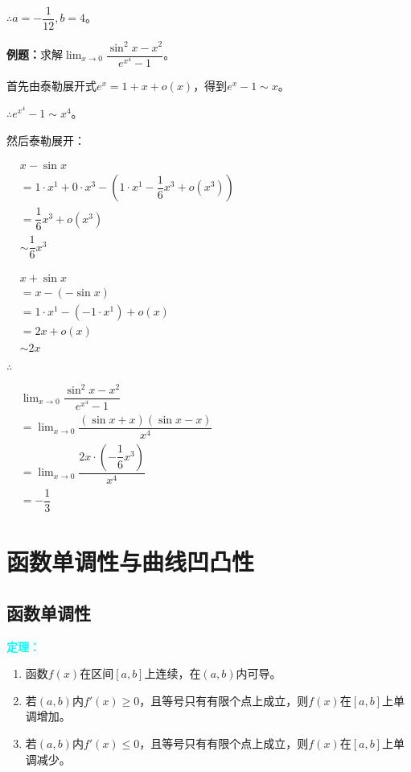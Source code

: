 \documentclass[UTF8, 12pt]{ctexart}
\begin{document}
$\therefore a=-\dfrac{1}{12},b=4$。

\textbf{例题：}求解$\lim_{x\to 0}\dfrac{\sin^2x-x^2}{e^{x^4}-1}$。

首先由泰勒展开式$e^x=1+x+o(x)$，得到$e^x-1\sim x$。

$\therefore e^{x^4}-1\sim x^4$。

然后泰勒展开：

$
\begin{aligned}
    & x-\sin x \\
    & = 1\cdot x^1+0\cdot x^3 - (1\cdot x^1-\dfrac{1}{6}x^3+o(x^3)) \\
    & = \dfrac{1}{6}x^3+o(x^3) \\
    & \sim \dfrac{1}{6}x^3
\end{aligned}
$

$
\begin{aligned}
    & x+\sin x \\
    & =x-(-\sin x) \\
    & =1\cdot x^1-(-1\cdot x^1)+o(x) \\
    & =2x+o(x) \\
    & \sim 2x
\end{aligned}
$

$\therefore$ \bigskip

$
\begin{aligned}
    & \lim_{x\to 0}\dfrac{\sin^2x-x^2}{e^{x^4}-1} \\
    & =\lim_{x\to 0}\dfrac{(\sin x+x)(\sin x-x)}{x^4} \\
    & =\lim_{x\to 0}\dfrac{2x\cdot\left(-\dfrac{1}{6}x^3\right)}{x^4} \\
    & =-\dfrac{1}{3}
\end{aligned}
$

\section{函数单调性与曲线凹凸性}

\subsection{函数单调性}

\textcolor{aqua}{\textbf{定理：}}

\begin{enumerate}
    \item 函数$f(x)$在区间$[a,b]$上连续，在$(a,b)$内可导。
    \item 若$(a,b)$内$f'(x)\geqslant 0$，且等号只有有限个点上成立，则$f(x)$在$[a,b]$上单调增加。
    \item 若$(a,b)$内$f'(x)\leqslant 0$，且等号只有有限个点上成立，则$f(x)$在$[a,b]$上单调减少。
\end{enumerate}
\end{document}
